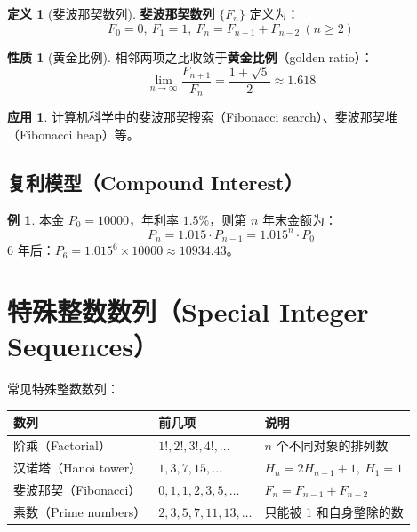 \documentclass[UTF8,11pt,a4paper]{ctexbook}   %
\theoremstyle{definition}
\newtheorem{definition}{定义}[section]
\newtheorem{example}{例}[section]
\newtheorem{property}{性质}[section]
\newtheorem{application}{应用}[section]
\begin{document}
\begin{definition}[斐波那契数列]
\textbf{斐波那契数列} $\{F_n\}$ 定义为：
\[
F_0 = 0,\ F_1 = 1,\ F_n = F_{n-1} + F_{n-2}\ (n \geq 2)
\]
\end{definition}

\begin{property}[黄金比例]
相邻两项之比收敛于\textbf{黄金比例}（golden ratio）：
\[
\lim_{n \to \infty} \frac{F_{n+1}}{F_n} = \frac{1+\sqrt{5}}{2} \approx 1.618
\]
\end{property}

\begin{application}
计算机科学中的斐波那契搜索（Fibonacci search）、斐波那契堆（Fibonacci heap）等。
\end{application}

\subsection{复利模型（Compound Interest）}

\begin{example}
本金 $P_0 = 10000$，年利率 $1.5\%$，则第 $n$ 年末金额为：
\[
P_n = 1.015 \cdot P_{n-1} = 1.015^n \cdot P_0
\]
6 年后：$P_6 = 1.015^6 \times 10000 \approx 10934.43$。
\end{example}

\section{特殊整数数列（Special Integer Sequences）}

常见特殊整数数列：

\begin{table}[htbp]
\centering
\begin{tabular}{|l|l|l|}
\hline
\textbf{数列} & \textbf{前几项} & \textbf{说明} \\
\hline
阶乘（Factorial） & $1!, 2!, 3!, 4!, \ldots$ & $n$ 个不同对象的排列数 \\
汉诺塔（Hanoi tower） & $1, 3, 7, 15, \ldots$ & $H_n = 2H_{n-1}+1,\ H_1=1$ \\
斐波那契（Fibonacci） & $0, 1, 1, 2, 3, 5, \ldots$ & $F_n = F_{n-1}+F_{n-2}$ \\
素数（Prime numbers） & $2, 3, 5, 7, 11, 13, \ldots$ & 只能被 1 和自身整除的数 \\
\hline
\end{tabular}
\end{table}
\end{document}
